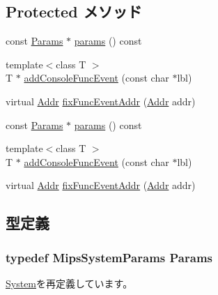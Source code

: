 \subsection*{Protected メソッド}
\begin{DoxyCompactItemize}
\item 
const \hyperlink{classMipsSystem_acf01be080284e8262bc1ff41fbd1710c}{Params} $\ast$ \hyperlink{classMipsSystem_acd3c3feb78ae7a8f88fe0f110a718dff}{params} () const 
\item 
{\footnotesize template$<$class T $>$ }\\T $\ast$ \hyperlink{classMipsSystem_a144f0e3cc56a01c7425853cc5ad44021}{addConsoleFuncEvent} (const char $\ast$lbl)
\item 
virtual \hyperlink{base_2types_8hh_af1bb03d6a4ee096394a6749f0a169232}{Addr} \hyperlink{classMipsSystem_ac72b76fe05499c31c7091ec5a56c0d52}{fixFuncEventAddr} (\hyperlink{base_2types_8hh_af1bb03d6a4ee096394a6749f0a169232}{Addr} addr)
\item 
const \hyperlink{classMipsSystem_acf01be080284e8262bc1ff41fbd1710c}{Params} $\ast$ \hyperlink{classMipsSystem_acd3c3feb78ae7a8f88fe0f110a718dff}{params} () const 
\item 
{\footnotesize template$<$class T $>$ }\\T $\ast$ \hyperlink{classMipsSystem_a144f0e3cc56a01c7425853cc5ad44021}{addConsoleFuncEvent} (const char $\ast$lbl)
\item 
virtual \hyperlink{base_2types_8hh_af1bb03d6a4ee096394a6749f0a169232}{Addr} \hyperlink{classMipsSystem_aff94f650c5eef23b8dc350ea755bdef4}{fixFuncEventAddr} (\hyperlink{base_2types_8hh_af1bb03d6a4ee096394a6749f0a169232}{Addr} addr)
\end{DoxyCompactItemize}


\subsection{型定義}
\hypertarget{classMipsSystem_acf01be080284e8262bc1ff41fbd1710c}{
\subsubsection[{Params}]{\setlength{\rightskip}{0pt plus 5cm}typedef MipsSystemParams {\bf Params}}}
\label{classMipsSystem_acf01be080284e8262bc1ff41fbd1710c}


\hyperlink{classSystem_a5f461be6222ce76bffcb70f27d820c56}{System}を再定義しています。


